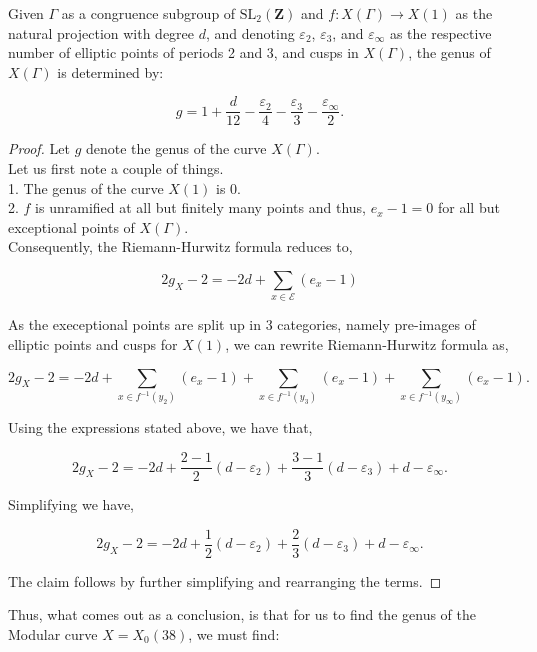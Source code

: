 \begin{theorem}
    Given \( \Gamma \) as a congruence subgroup of \( \mathrm{SL}_{2}(\mathbf{Z}) \) and \( f: X(\Gamma) \rightarrow X(1) \) as the natural projection with degree \( d \), and denoting \( \varepsilon_{2} \), \( \varepsilon_{3} \), and \( \varepsilon_{\infty} \) as the respective number of elliptic points of periods 2 and 3, and cusps in \( X(\Gamma) \), the genus of \( X(\Gamma) \) is determined by:

\[
g = 1 + \frac{d}{12} - \frac{\varepsilon_{2}}{4} - \frac{\varepsilon_{3}}{3} - \frac{\varepsilon_{\infty}}{2}.
\]

\end{theorem}
\begin{proof} Let $g$ denote the genus of the curve $X(\Gamma)$.\\ 
Let us first note a couple of things. \\

1. The genus of the curve $X(1)$ is 0. \\
2. $f$ is unramified at all but finitely many points and thus, $e_x-1=0$ for all but exceptional points of $X(\Gamma)$. \\

Consequently, the Riemann-Hurwitz formula reduces to, 

\[
2 g_{X} - 2 = -2d + \sum_{x \in \mathcal{E}}(e_{x} - 1)
\]

As the execeptional points are split up in 3 categories, namely pre-images of elliptic points and cusps for $X(1)$, we can rewrite Riemann-Hurwitz formula as,

\[
2 g_{X} - 2 = -2d + \sum_{x \in f^{-1}(y_{2})}(e_{x} - 1) + \sum_{x \in f^{-1}(y_{3})}(e_{x} - 1) + \sum_{x \in f^{-1}(y_{\infty})}(e_{x} - 1).
\]

Using the expressions stated above, we have that, 

\[
2 g_{X} - 2 = -2d + \frac{2 - 1}{2}(d - \varepsilon_{2})+ \frac{3 - 1}{3}(d - \varepsilon_{3}) + d-\varepsilon_\infty .
\]

Simplifying we have,

\[
2 g_{X} - 2 = -2d + \frac{1}{2}(d - \varepsilon_{2})+ \frac{2}{3}(d - \varepsilon_{3}) + d-\varepsilon_\infty .
\]

The claim follows by further simplifying and rearranging the terms. 

\end{proof}

Thus, what comes out as a conclusion, is that for us to find the genus of the Modular curve $X=X_0(38)$, we must find:

